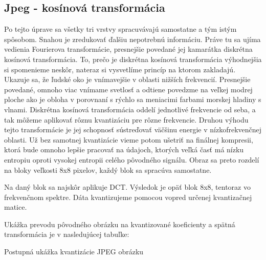 \subsection{Jpeg - kosínová transformácia}

Po tejto úprave sa všetky tri vrstvy spracuvávajú samostatne a tým
istým spôsobom. Snahou je zredukovať ďalšiu nepotrebnú informáciu.
Práve tu sa ujíma vedienia Fourierova transformácie, presnejšie
povedané jej kamarátka diskrétna kosínová transformácia. To, prečo je
diskrétna kosínová transformácia výhodnejšia si spomenieme neskôr,
nateraz si vysvetlíme princíp na ktorom zakladajú. Ukazuje sa, že
ľudské oko je vnímavejšie v oblasti nižších frekvencií. Presnejšie
povedané, omnoho viac vnímame svetlosť a odtiene povedzme na veľkej
modrej ploche ako je obloha v porovnaní s rýchlo sa meniacimi farbami
morskej hladiny s vlnami. Diskrétna kosínová transformácia oddelí
jednotlivé frekvencie od seba, a tak môžeme aplikovať rôznu
kvantizáciu pre rôzne frekvencie. Druhou výhodu tejto transformácie je
jej schopnosť sústreďovať väčšinu energie v nízkofrekvenčnej oblasti.
Už bez samotnej kvantizácie vieme potom ušetriť na finálnej kompresii,
ktorá bude omnoho lepšie pracovať na údajoch, ktorých veľká časť má
nízku entropiu oproti vysokej entropii celého pôvodného signálu.
Obraz sa preto rozdelí na bloky veľkosti 8x8 pixelov, každý blok sa
spracúva samostatne.

Na daný blok sa najskôr aplikuje DCT. Výsledok je opäť blok 8x8,
tentoraz vo frekvenčnom spektre. Dáta kvantizujeme pomocou vopred
určenej kvantizačnej matice.

Ukážka prevodu pôvodného obrázku na kvantizované koeficienty a
spätná transformácia je v nasledujúcej tabuľke:


\begin{table}[htb]
    \centering

    \subtable[DCT]{
    \tiny
    
    }

    \subtable[Po kvantizácii]{
    \tiny
    
    }
    
    \subtable[Dekvantizácia]{
    \tiny
    
    }
    
    
    \caption{Postupná ukážka kvantizácie JPEG obrázku}
    \label{tab:jpeg}
\end{table}


